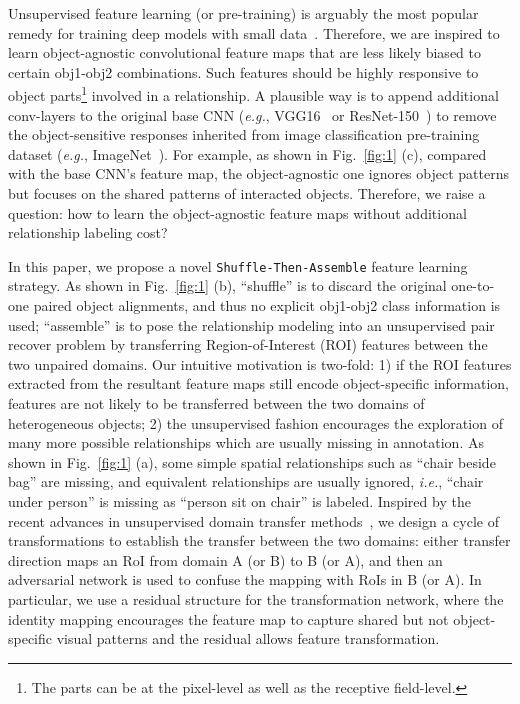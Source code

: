 \documentclass[runningheads]{llncs}
\newcommand{\eg}{\textit{e.g.}}
\newcommand{\ie}{\textit{i.e.}}
\begin{document}
Unsupervised feature learning (or pre-training) is arguably the most popular remedy for training deep models with small data~\cite{zhang2017split,noroozi2016unsupervised,doersch2015unsupervised,radford2015unsupervised,donahue2016adversarial,tao2017zero}. Therefore, we are inspired to learn object-agnostic convolutional feature maps that are less likely biased to certain obj1-obj2 combinations. Such features should be highly responsive to object parts\footnote[1]{The parts can be at the pixel-level as well as the receptive field-level.} involved in a relationship.  A plausible way is to append additional conv-layers to the original base CNN (\eg, VGG16~\cite{simonyan2014very} or ResNet-150~\cite{he2016deep}) to remove the object-sensitive responses inherited from image classification pre-training dataset (\eg, ImageNet~\cite{deng2009imagenet}). For example, as shown in Fig.~\ref{fig:1} (c), compared with the base CNN's feature map, the object-agnostic one ignores object patterns but focuses on the shared patterns of interacted objects. Therefore, we raise a question: how to learn the object-agnostic feature maps without additional relationship labeling cost?

In this paper, we propose a novel \texttt{Shuffle-Then-Assemble} feature learning strategy. As shown in Fig.~\ref{fig:1} (b), ``shuffle'' is to discard the original one-to-one paired object alignments, and thus no explicit obj1-obj2 class information is used; ``assemble'' is to pose the relationship modeling into an unsupervised pair recover problem by transferring Region-of-Interest (ROI) features between the two unpaired domains. Our intuitive motivation is two-fold: 1) if the ROI features extracted from the resultant feature maps still encode object-specific information, features are not likely to be transferred between the two domains of heterogeneous objects; 2) the unsupervised fashion encourages the exploration of many more possible relationships which are usually missing in annotation. As shown in Fig.~\ref{fig:1} (a), some simple spatial relationships such as ``chair beside bag'' are missing, and equivalent relationships are usually ignored, \ie, ``chair under person'' is missing as ``person sit on chair'' is labeled. Inspired by the recent advances in unsupervised domain transfer methods~\cite{zhu2017unpaired,kim2017learning,hoffman2017cycada,yi2017dualgan}, we design a cycle of transformations to establish the transfer between the two domains: either transfer direction maps an RoI from domain A (or B) to B (or A), and then an adversarial network is used to confuse the mapping with RoIs in B (or A). In particular, we use a residual structure for the transformation network, where the identity mapping encourages the feature map to capture shared but not object-specific visual patterns and the residual allows feature transformation.
\end{document}

